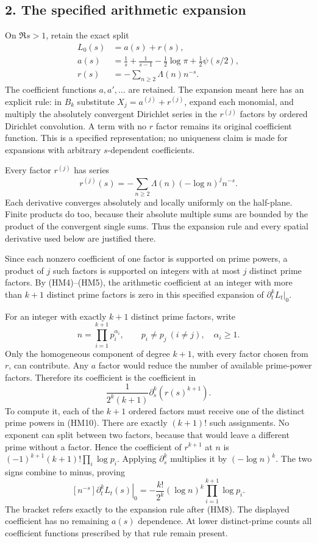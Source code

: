 \documentclass[
  10pt,
  a4paper,
]{article}
\begin{document}
\subsection{2. The specified arithmetic
expansion}\label{the-specified-arithmetic-expansion}

On \(\Re s>1\), retain the exact split \[
\begin{aligned}
L_0(s)&=a(s)+r(s),\\
a(s)&=\frac1s+\frac1{s-1}-\frac12\log\pi+\frac12\psi(s/2),\\
r(s)&=-\sum_{n\ge2}\Lambda(n)n^{-s}.
\end{aligned}\tag{HM8}
\] The coefficient functions \(a,a',\ldots\) are retained. The expansion
meant here has an explicit rule: in \(B_k\) substitute
\(X_j=a^{(j)}+r^{(j)}\), expand each monomial, and multiply the
absolutely convergent Dirichlet series in the \(r^{(j)}\) factors by
ordered Dirichlet convolution. A term with no \(r\) factor remains its
original coefficient function. This is a specified representation; no
uniqueness claim is made for expansions with arbitrary \(s\)-dependent
coefficients.

Every factor \(r^{(j)}\) has series \[
r^{(j)}(s)=-\sum_{n\ge2}\Lambda(n)(-\log n)^j n^{-s}.
\tag{HM9}
\] Each derivative converges absolutely and locally uniformly on the
half-plane. Finite products do too, because their absolute multiple sums
are bounded by the product of the convergent single sums. Thus the
expansion rule and every spatial derivative used below are justified
there.

Since each nonzero coefficient of one factor is supported on prime
powers, a product of \(j\) such factors is supported on integers with at
most \(j\) distinct prime factors. By (HM4)--(HM5), the arithmetic
coefficient at an integer with more than \(k+1\) distinct prime factors
is zero in this specified expansion of \(\partial_t^kL_t|_0\).

For an integer with exactly \(k+1\) distinct prime factors, write \[
n=\prod_{i=1}^{k+1}p_i^{\alpha_i},\qquad
p_i\ne p_j\ (i\ne j),\quad\alpha_i\ge1.
\tag{HM10}
\] Only the homogeneous component of degree \(k+1\), with every factor
chosen from \(r\), can contribute. Any \(a\) factor would reduce the
number of available prime-power factors. Therefore its coefficient is
the coefficient in \[
\frac1{2^k(k+1)}\partial_s^k(r(s)^{k+1}).
\tag{HM11}
\] To compute it, each of the \(k+1\) ordered factors must receive one
of the distinct prime powers in (HM10). There are exactly \((k+1)!\)
such assignments. No exponent can split between two factors, because
that would leave a different prime without a factor. Hence the
coefficient of \(r^{k+1}\) at \(n\) is
\((-1)^{k+1}(k+1)!\prod_i\log p_i\). Applying \(\partial_s^k\)
multiplies it by \((-\log n)^k\). The two signs combine to minus,
proving \[
\boxed{[n^{-s}]\left.\partial_t^kL_t(s)\right|_0
=-\frac{k!}{2^k}(\log n)^k\prod_{i=1}^{k+1}\log p_i.}
\tag{HM12}
\] The bracket refers exactly to the expansion rule after (HM8). The
displayed coefficient has no remaining \(a(s)\) dependence. At lower
distinct-prime counts all coefficient functions prescribed by that rule
remain present.
\end{document}

